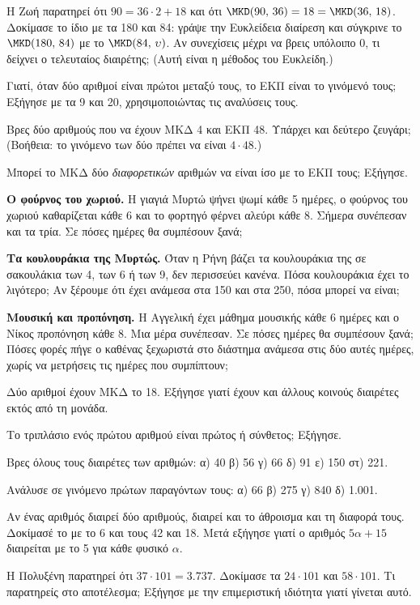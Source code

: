 \ex Η Ζωή παρατηρεί ότι $90=36\cdot 2+18$ και ότι $\MKD(90,\,36)=18=\MKD(36,\,18)$. Δοκίμασε το ίδιο με τα 180 και 84: γράψε την Ευκλείδεια διαίρεση και σύγκρινε το $\MKD(180,\,84)$ με το $\MKD(84,\,\upsilon)$. Αν συνεχίσεις μέχρι να βρεις υπόλοιπο 0, τι δείχνει ο τελευταίος διαιρέτης; (Αυτή είναι η μέθοδος του Ευκλείδη.)

\ex Γιατί, όταν δύο αριθμοί είναι πρώτοι μεταξύ τους, το ΕΚΠ είναι το γινόμενό τους; Εξήγησε με τα 9 και 20, χρησιμοποιώντας τις αναλύσεις τους.

\ex Βρες δύο αριθμούς που να έχουν ΜΚΔ 4 και ΕΚΠ 48. Υπάρχει και δεύτερο ζευγάρι; (Βοήθεια: το γινόμενο των δύο πρέπει να είναι $4\cdot 48$.)

\ex Μπορεί το ΜΚΔ δύο \emph{διαφορετικών} αριθμών να είναι ίσο με το ΕΚΠ τους; Εξήγησε.


\ex \textbf{Ο φούρνος του χωριού.} Η γιαγιά Μυρτώ ψήνει ψωμί κάθε 5 ημέρες, ο φούρνος του χωριού καθαρίζεται κάθε 6 και το φορτηγό φέρνει αλεύρι κάθε 8. Σήμερα συνέπεσαν και τα τρία. Σε πόσες ημέρες θα συμπέσουν ξανά;

\ex \textbf{Τα κουλουράκια της Μυρτώς.} Όταν η Ρήνη βάζει τα κουλουράκια της σε σακουλάκια των 4, των 6 ή των 9, δεν περισσεύει κανένα. Πόσα κουλουράκια έχει το λιγότερο; Αν ξέρουμε ότι έχει ανάμεσα στα 150 και στα 250, πόσα μπορεί να είναι;

\ex \textbf{Μουσική και προπόνηση.} Η Αγγελική έχει μάθημα μουσικής κάθε 6 ημέρες και ο Νίκος προπόνηση κάθε 8. Μια μέρα συνέπεσαν. Σε πόσες ημέρες θα συμπέσουν ξανά; Πόσες φορές πήγε ο καθένας ξεχωριστά στο διάστημα ανάμεσα στις δύο αυτές ημέρες, χωρίς να μετρήσεις τις ημέρες που συμπίπτουν;

\ex Δύο αριθμοί έχουν ΜΚΔ το 18. Εξήγησε γιατί έχουν και άλλους κοινούς διαιρέτες εκτός από τη μονάδα.

\ex Το τριπλάσιο ενός πρώτου αριθμού είναι πρώτος ή σύνθετος; Εξήγησε.

\ex Βρες όλους τους διαιρέτες των αριθμών: α) 40 \quad β) 56 \quad γ) 66 \quad δ) 91 \quad ε) 150 \quad στ) 221.

\ex Ανάλυσε σε γινόμενο πρώτων παραγόντων τους: α) 66 \quad β) 275 \quad γ) 840 \quad δ) 1.001.

\ex Αν ένας αριθμός διαιρεί δύο αριθμούς, διαιρεί και το άθροισμα και τη διαφορά τους. Δοκίμασέ το με το 6 και τους 42 και 18. Μετά εξήγησε γιατί ο αριθμός $5\alpha+15$ διαιρείται με το 5 για κάθε φυσικό $\alpha$.

\ex Η Πολυξένη παρατηρεί ότι $37\cdot 101=3.737$. Δοκίμασε τα $24\cdot 101$ και $58\cdot 101$. Τι παρατηρείς στο αποτέλεσμα; Εξήγησε με την επιμεριστική ιδιότητα γιατί γίνεται αυτό.
